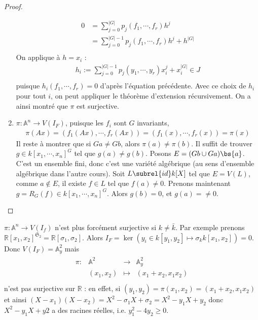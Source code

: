 \begin{proof}
\begin{enumerate}
                    \begin{align*}
                        0 &= \sum_{j = 0}^{|G|} p_j(f_1, \cdots, f_r) h^j \\
                        &= \sum_{j = 0}^{|G| - 1} p_j(f_1, \cdots, f_r) h^j + h^{|G|} \\
                    \end{align*}
                    On applique à $h = x_i$ :
                    \begin{align*}
                        h_i := \sum_{j = 0}^{|G| - 1} p_j(y_1, \cdots, y_r) x_i^j + x_i^{|G|} \in J \\
                    \end{align*}
                    puisque $h_i(f_1, \cdots, f_r) = 0$ d'après l'équation précédente. Avec ce choix de $h_i$ pour tout $i$, on peut appliquer le théorème d'extension récursivement. On a ainsi montré que $\pi$ est surjective.
                    \item $\pi : \mathbb{A}^n \to V(I_F)$, puisque les $f_i$ sont $G$ invariants,
                    \begin{align*}
                        \pi(Ax) = (f_1(Ax), \cdots, f_r(Ax)) = (f_1(x), \cdots, f_r(x)) = \pi(x)
                    \end{align*}
                    Il reste à montrer que si $Ga \neq Gb$, alors $\pi(a) \neq \pi(b)$. Il suffit de trouver $g \in k[x_1, \cdots, x_n]^G$ tel que $g(a) \neq g(b)$. Posons $E = (Gb \cup Ga) \bs \{a\}$. C'est un ensemble fini, donc c'est une variété algébrique (au sens d'ensemble algébrique dans l'autre cours). Soit $L \subrel{id} k[X]$ tel que $E = V(L)$, comme $a \notin E$, il existe $f \in L$ tel que $f(a) \neq 0$. Prenons maintenant $g = R_G(f) \in k[x_1, \cdots, x_n]^G$. Alors $g(b) = 0$, et $g(a) = \neq 0$. 
                \end{enumerate}
            \end{proof}
            \begin{remq}
                $\pi : \mathbb{A}^n \to V(I_f)$ n'est plus forcément surjective si $k \neq \bar k$. Par exemple prenons $\mathbb{R}[x_1, x_2]^{\mathfrak{S}_2} = \mathbb{R}[\sigma_1, \sigma_2]$. Alors $I_F = \ker(y_i \in k[y_1, y_2] \mapsto \sigma_k k[x_1, x_2]) = 0$. Donc $V(I_F) = \mathbb{A}^2_y$ mais
                \begin{align*}
                    \begin{array}{cccc}
                        \pi : & \mathbb{A}^2 & \to & \mathbb{A}^2_y \\
                        & (x_1, x_2) & \mapsto & (x_1 + x_2, x_1x_2) \\
                    \end{array}
                \end{align*}
                n'est pas surjective sur $\mathbb{R}$ : en effet, si $(y_1, y_2) = \pi(x_1, x_2) = (x_1 + x_2, x_1x_2)$ et ainsi $(X - x_1)(X - x_2) = X^2 - \sigma_1X + \sigma_2 = X^2 - y_1X + y_2$ donc $X^2 - y_1X + y2$ a des racines réelles, i.e. $y_1^2 - 4y_2 \geq 0$.
            \end{remq}